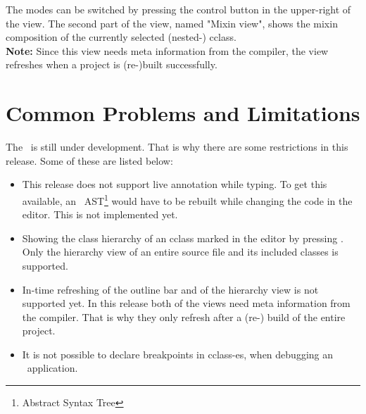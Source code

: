 The modes can be switched by pressing the control button in the upper-right of the view. The second part of the view, named "Mixin view", shows the mixin composition of the currently selected (nested-) cclass.\\
\textbf{Note:} Since this view needs meta information from the compiler, the view refreshes when a project is (re-)built successfully.

\section{Common Problems and Limitations}
The \cjdt ~is still under development. That is why there are some restrictions in this release. Some of these are listed below:
\begin{itemize}
	\item This release does not support live annotation while typing. To get this available, an \caesarj ~AST\footnote{Abstract Syntax Tree} would have to be rebuilt while changing the code in the editor. This is not implemented yet.
	\item Showing the class hierarchy of an cclass marked in the editor by pressing . Only the hierarchy view of an entire source file and its included classes is supported.
	\item In-time refreshing of the outline bar and of the hierarchy view is not supported yet. In this release both of the views need meta information from the compiler. That is why they only refresh after a (re-) build of the entire project.
	\item It is not possible to declare breakpoints in cclass-es, when debugging an \caesarj ~application.
\end{itemize}
